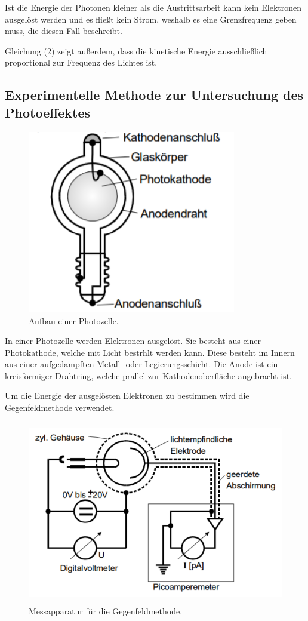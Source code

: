 Ist die Energie der Photonen kleiner als die Austrittsarbeit kann kein Elektronen ausgelöst werden und
es fließt kein Strom, weshalb es eine Grenzfrequenz geben muss, die diesen Fall beschreibt.

Gleichung (2) zeigt außerdem, dass die kinetische Energie ausschließlich proportional zur Frequenz des Lichtes ist.

\subsection{Experimentelle Methode zur Untersuchung des Photoeffektes}

\begin{figure}[H]
  \centering
  \includegraphics[height=8cm]{photozelle.PNG}
  \caption{Aufbau einer Photozelle. \cite{sample}}
  \label{fig:kathode}
\end{figure}

In einer Photozelle werden Elektronen ausgelöst. Sie besteht aus einer Photokathode, welche mit Licht bestrhlt werden kann.
Diese besteht im Innern aus einer aufgedampften Metall- oder Legierungsschicht.
Die Anode ist ein kreisförmiger Drahtring, welche prallel zur Kathodenoberfläche angebracht ist.

Um die Energie der ausgelösten Elektronen zu bestimmen wird die Gegenfeldmethode verwendet.


\begin{figure}[H]
  \centering
  \includegraphics[height=8cm]{gegenfeld.PNG}
  \caption{Messapparatur für die Gegenfeldmethode. \cite{sample}}
  \label{fig:kathode}
\end{figure}

